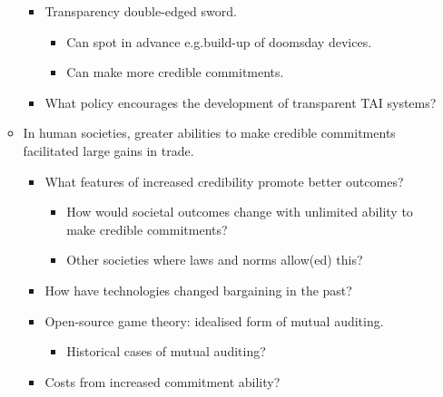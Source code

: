\begin{itemize}
\begin{itemize}
\begin{itemize}
            \item Transparency double-edged sword.
            \begin{itemize}
                \item Can spot in advance e.g.\@ build-up of doomsday devices.
                \item Can make more credible commitments.
            \end{itemize}
            \item What policy encourages the development of transparent TAI systems?
        \end{itemize}
        \item In human societies, greater abilities to make credible commitments facilitated large gains in trade.
        \begin{itemize}
            \item What features of increased credibility promote better outcomes?
            \begin{itemize}
                \item How would societal outcomes change with unlimited ability to make credible commitments?
                \item Other societies where laws and norms allow(ed) this?
            \end{itemize}
            \item How have technologies changed bargaining in the past?
            \item Open-source game theory: idealised form of mutual auditing.
            \begin{itemize}
                \item Historical cases of mutual auditing?
            \end{itemize}
            \item Costs from increased commitment ability?
        \end{itemize}
    \end{itemize}
\end{itemize}